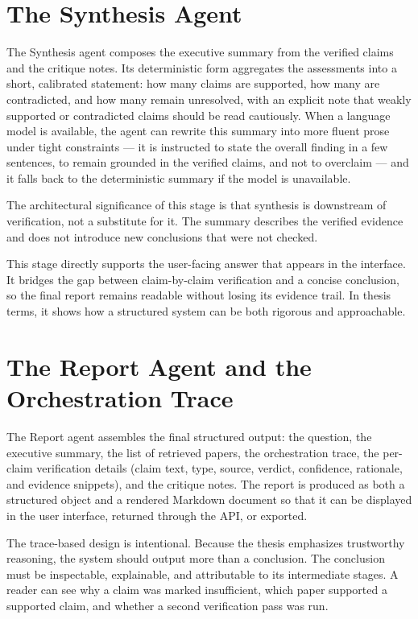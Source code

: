 \section{The Synthesis Agent }

The Synthesis agent composes the executive summary from the verified claims and the critique notes. Its
deterministic form aggregates the assessments into a short, calibrated statement: how many claims are supported,
how many are contradicted, and how many remain unresolved, with an explicit note that weakly supported or
contradicted claims should be read cautiously. When a language model is available, the agent can rewrite this
summary into more fluent prose under tight constraints --- it is instructed to state the overall finding in a few
sentences, to remain grounded in the verified claims, and not to overclaim --- and it falls back to the
deterministic summary if the model is unavailable.

The architectural significance of this stage is that synthesis is downstream of verification, not a substitute for
it. The summary describes the verified evidence and does not introduce new conclusions that were not checked.

This stage directly supports the user-facing answer that appears in the interface. It bridges the gap between
claim-by-claim verification and a concise conclusion, so the final report remains readable without losing its
evidence trail. In thesis terms, it shows how a structured system can be both rigorous and approachable.

\section{The Report Agent and the Orchestration Trace }

The Report agent assembles the final structured output: the question, the executive summary, the list of retrieved
papers, the orchestration trace, the per-claim verification details (claim text, type, source, verdict, confidence,
rationale, and evidence snippets), and the critique notes. The report is produced as both a structured object and a
rendered Markdown document so that it can be displayed in the user interface, returned through the API, or exported.

The trace-based design is intentional. Because the thesis emphasizes trustworthy reasoning, the system should
output more than a conclusion. The conclusion must be inspectable, explainable, and attributable to its
intermediate stages. A reader can see why a claim was marked insufficient, which paper supported a supported claim,
and whether a second verification pass was run.

